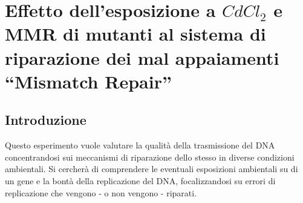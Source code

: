 \section*{Effetto dell'esposizione a \emph{$CdCl_{2}$} e MMR di mutanti al sistema di riparazione dei mal appaiamenti ``Mismatch Repair''}

	\subsection*{Introduzione}
	Questo esperimento vuole valutare la qualità della trasmissione del DNA concentrandosi sui meccanismi di riparazione dello stesso in diverse condizioni ambientali.
	Si cercherà di comprendere le eventuali esposizioni ambientali su di un gene e la bontà della replicazione del DNA, focalizzandosi su errori di replicazione che vengono - o non vengono - riparati. 

 
